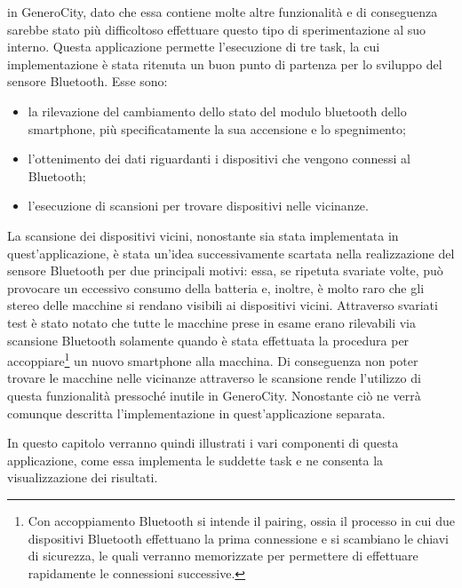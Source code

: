 in GeneroCity, dato che essa contiene molte altre funzionalità e di conseguenza sarebbe stato più difficoltoso effettuare questo tipo di sperimentazione al suo interno. Questa applicazione permette l'esecuzione di tre task, la cui implementazione è stata ritenuta un buon punto di partenza per lo sviluppo del sensore Bluetooth. Esse sono:
\begin{itemize}
    \item la rilevazione del cambiamento dello stato del modulo bluetooth dello smartphone, più specificatamente la sua accensione e lo spegnimento;
    \item l'ottenimento dei dati riguardanti i dispositivi che vengono connessi al Bluetooth;
    \item l'esecuzione di scansioni per trovare dispositivi nelle vicinanze.
\end{itemize}
La scansione dei dispositivi vicini, nonostante sia stata implementata in quest'applicazione, è stata un'idea successivamente scartata nella realizzazione del sensore Bluetooth per due principali motivi: essa, se ripetuta svariate volte, può provocare un eccessivo consumo della batteria e, inoltre, è molto raro che gli stereo delle macchine si rendano visibili ai dispositivi vicini. Attraverso svariati test è stato notato che tutte le macchine prese in esame erano rilevabili via scansione Bluetooth solamente quando è stata effettuata la procedura per accoppiare\footnote{Con accoppiamento Bluetooth si intende il pairing, ossia il processo in cui due dispositivi Bluetooth effettuano la prima connessione e si scambiano le chiavi di sicurezza, le quali verranno memorizzate per permettere di effettuare rapidamente le connessioni successive.} un nuovo smartphone alla macchina. Di conseguenza non poter trovare le macchine nelle vicinanze attraverso le scansione rende l'utilizzo di questa funzionalità pressoché inutile in GeneroCity. Nonostante ciò ne verrà comunque descritta l'implementazione in quest'applicazione separata.

In questo capitolo verranno quindi illustrati i vari componenti di questa applicazione, come essa implementa le suddette task e ne consenta la visualizzazione dei risultati. 

